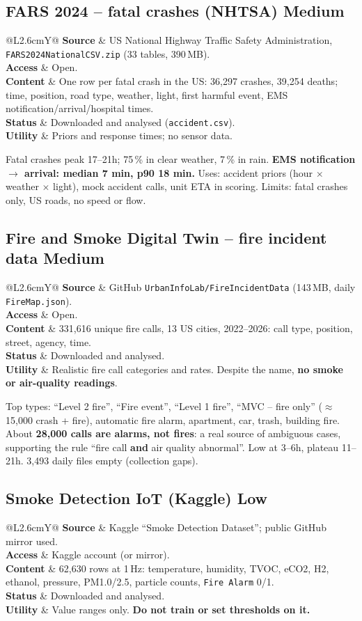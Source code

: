 \documentclass[10pt,a4paper]{article}
\makeatletter
\newcommand{\code}[1]{\texttt{#1}}
\newcommand{\MED}{\textbf{\textcolor{med}{Medium}}}
\newcommand{\LOW}{\textbf{\textcolor{lo}{Low}}}
\newcommand{\facts}[5]{%
\noindent\begin{tabularx}{\textwidth}{@{}L{2.6cm}Y@{}}
\textbf{Source} & #1\\
\textbf{Access} & #2\\
\textbf{Content} & #3\\
\textbf{Status} & #4\\
\textbf{Utility} & #5\\
\end{tabularx}\par\smallskip}
\makeatother
\begin{document}
\subsection{FARS 2024 -- fatal crashes (NHTSA) \hfill \MED}
\facts{US National Highway Traffic Safety Administration, \code{FARS2024NationalCSV.zip} (33 tables, 390\,MB).}
{Open.}
{One row per fatal crash in the US: 36,297 crashes, 39,254 deaths; time, position, road type, weather, light, first harmful event, EMS notification/arrival/hospital times.}
{Downloaded and analysed (\code{accident.csv}).}
{Priors and response times; no sensor data.}

Fatal crashes peak 17--21h; 75\,\% in clear weather, 7\,\% in rain. \textbf{EMS notification $\rightarrow$ arrival: median 7 min, p90 18 min.} Uses: accident priors (hour $\times$ weather $\times$ light), mock accident calls, unit ETA in scoring. Limits: fatal crashes only, US roads, no speed or flow.

\subsection{Fire and Smoke Digital Twin -- fire incident data \hfill \MED}
\facts{GitHub \code{UrbanInfoLab/FireIncidentData} (143\,MB, daily \code{FireMap.json}).}
{Open.}
{331,616 unique fire calls, 13 US cities, 2022--2026: call type, position, street, agency, time.}
{Downloaded and analysed.}
{Realistic fire call categories and rates. Despite the name, \textbf{no smoke or air-quality readings}.}

Top types: ``Level 2 fire'', ``Fire event'', ``Level 1 fire'', ``MVC -- fire only'' ($\approx$15,000 crash + fire), automatic fire alarm, apartment, car, trash, building fire. About \textbf{28,000 calls are alarms, not fires}: a real source of ambiguous cases, supporting the rule ``fire call \textbf{and} air quality abnormal''. Low at 3--6h, plateau 11--21h. 3,493 daily files empty (collection gaps).

\subsection{Smoke Detection IoT (Kaggle) \hfill \LOW}
\facts{Kaggle ``Smoke Detection Dataset''; public GitHub mirror used.}
{Kaggle account (or mirror).}
{62,630 rows at 1\,Hz: temperature, humidity, TVOC, eCO2, H2, ethanol, pressure, PM1.0/2.5, particle counts, \code{Fire Alarm} 0/1.}
{Downloaded and analysed.}
{Value ranges only. \textbf{Do not train or set thresholds on it.}}
\end{document}
